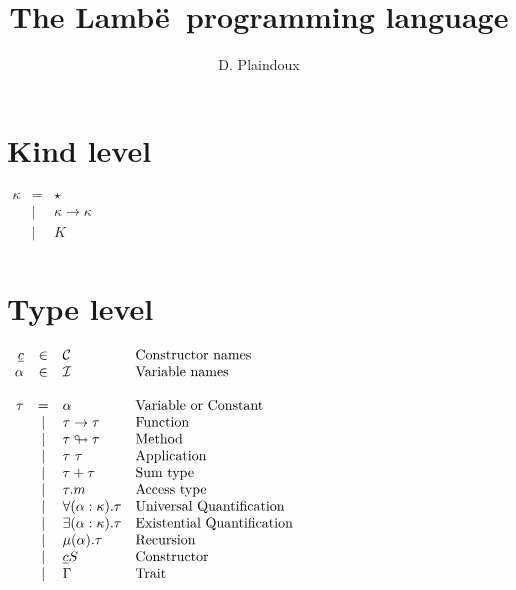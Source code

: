 \documentclass{article}[11pt]
\newcommand{\lambe}[0]{{\sf Lamb\"e~}}
\begin{document}
    \title{The \lambe programming language}
    \author{D. Plaindoux}

    \maketitle


    \section{Kind level}\label{sec:kind-level}

    \begin{math}
        \begin{array}{rcll}
            \kappa
            & =    & \star                     \\
            & \mid & \kappa \rightarrow \kappa \\
            & \mid & K                         \\
        \end{array}
    \end{math}


    \section{Type level}\label{sec:type-level}

    \begin{math}
        \begin{array}{rclp{5cm}}
            \underline{c} & \in  & {\cal C}                     & Constructor names          \\
            \alpha        & \in  & {\cal I}                     & Variable names             \\
            \\
            \tau & =
            & \alpha                       & Variable or Constant              \\
            & \mid & \tau \rightarrow \tau        & Function              \\
            & \mid & \tau \looparrowright \tau    & Method              \\
            & \mid & \tau~\tau                    & Application              \\
            & \mid & \tau + \tau                  & Sum~type              \\
            & \mid & \tau . m                  & Access~type              \\
            & \mid & \forall (\alpha:\kappa).\tau & Universal~Quantification              \\
            & \mid & \exists (\alpha:\kappa).\tau & Existential~Quantification              \\
            & \mid & \mu(\alpha).\tau             & Recursion              \\
            & \mid & \underline{c} S              & Constructor              \\
            & \mid & \Gamma                       & Trait              \\
        \end{array}
    \end{math}
\end{document}

